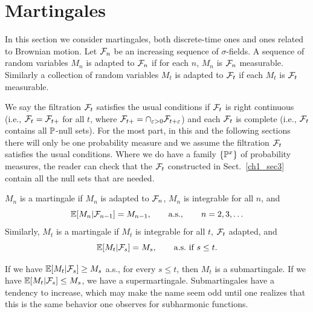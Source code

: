 \section{Martingales}\label{ch1_sec4}


In this section we consider martingales, both discrete-time ones and ones related to Brownian motion. Let $\FC_n$ be an increasing sequence of $\sigma$-fields. A sequence of random variables $M_n$ is adapted to $\FC_n$ if for each $n$, $M_n$ is $\FC_n$ measurable. Similarly a collection of random variables $M_t$ is adapted to $\FC_t$ if each $M_t$ is $\FC_t$ measurable.

We say the filtration $\FC_t$ satisfies the usual conditions if $\FC_t$ is right continuous (i.e., $\FC_t = \FC_{t+}$ for all $t$, where $\FC_{t+} = \cap_{\epsilon>0}\FC_{t+\epsilon}$) and each $\FC_t$ is complete (i.e., $\FC_t$ contains all $\P$-null sets). For the most part, in this and the following sections there will only be one probability measure and we assume the filtration $\FC_t$ satisfies the usual conditions. Where we do have a family $\{\P^x\}$ of probability measures, the reader can check that the $\FC_t$ constructed in Sect.\ \ref{ch1_sec3} contain all the null sets that are needed.

\begin{definition}\label{def:ch1_4.1}
$M_n$ is a martingale if $M_n$ is adapted to $\FC_n$, $M_n$ is integrable for all $n$, and
\begin{equation}\label{eq:ch1_4.1}
    \E[M_n\mid \FC_{n-1}] = M_{n-1}, \qquad \textnormal{a.s.}, \qquad n = 2,3,\ldots
\end{equation}
Similarly, $M_t$ is a martingale if $M_t$ is integrable for all $t$, $\FC_t$ adapted, and
\[
    \E[M_t\mid\FC_s] = M_s, \qquad \textnormal{a.s.}~\text{if}~s \leq t.
\]
\end{definition}

If we have $\E[M_t\mid\FC_s] \geq M_s$ a.s., for every $s \leq t$, then $M_t$ is a submartingale. If we have $\E[M_t\mid\FC_s] \leq M_s$, we have a supermartingale. Submartingales have a tendency to increase, which may make the name seem odd until one realizes that this is the same behavior one observes for subharmonic functions.

